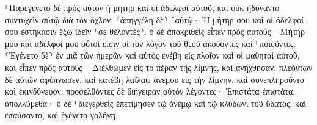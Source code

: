 \documentclass{openreader}
\begin{document}
⸀Παρεγένετο δὲ πρὸς αὐτὸν ἡ μήτηρ καὶ οἱ ἀδελφοὶ αὐτοῦ, καὶ οὐκ ἠδύναντο συντυχεῖν αὐτῷ διὰ τὸν ὄχλον. 
⸂ἀπηγγέλη δὲ⸃ ⸀αὐτῷ· Ἡ μήτηρ σου καὶ οἱ ἀδελφοί σου ἑστήκασιν ἔξω ἰδεῖν ⸂σε θέλοντές⸃. 
ὁ δὲ ἀποκριθεὶς εἶπεν πρὸς αὐτούς· Μήτηρ μου καὶ ἀδελφοί μου οὗτοί εἰσιν οἱ τὸν λόγον τοῦ θεοῦ ἀκούοντες καὶ ⸀ποιοῦντες. 
⸂Ἐγένετο δὲ⸃ ἐν μιᾷ τῶν ἡμερῶν καὶ αὐτὸς ἐνέβη εἰς πλοῖον καὶ οἱ μαθηταὶ αὐτοῦ, καὶ εἶπεν πρὸς αὐτούς· Διέλθωμεν εἰς τὸ πέραν τῆς λίμνης, καὶ ἀνήχθησαν. 
πλεόντων δὲ αὐτῶν ἀφύπνωσεν. καὶ κατέβη λαῖλαψ ἀνέμου εἰς τὴν λίμνην, καὶ συνεπληροῦντο καὶ ἐκινδύνευον. 
προσελθόντες δὲ διήγειραν αὐτὸν λέγοντες· Ἐπιστάτα ἐπιστάτα, ἀπολλύμεθα· ὁ δὲ ⸀διεγερθεὶς ἐπετίμησεν τῷ ἀνέμῳ καὶ τῷ κλύδωνι τοῦ ὕδατος, καὶ ἐπαύσαντο, καὶ ἐγένετο γαλήνη. 
\end{document}
